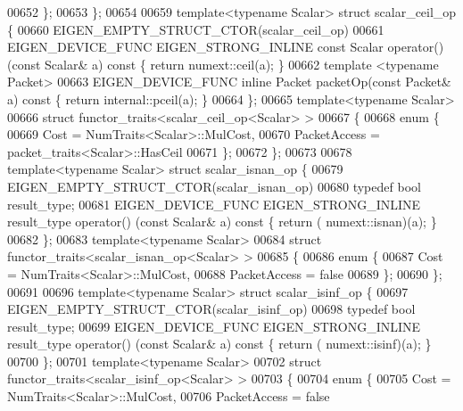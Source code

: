 \begin{DoxyCode}
00652   \};
00653 \};
00654 
00659 \textcolor{keyword}{template}<\textcolor{keyword}{typename} Scalar> \textcolor{keyword}{struct }scalar\_ceil\_op \{
00660   EIGEN\_EMPTY\_STRUCT\_CTOR(scalar\_ceil\_op)
00661   EIGEN\_DEVICE\_FUNC EIGEN\_STRONG\_INLINE \textcolor{keyword}{const} Scalar operator() (\textcolor{keyword}{const} Scalar& a)\textcolor{keyword}{ const }\{ \textcolor{keywordflow}{return} 
      numext::ceil(a); \}
00662   \textcolor{keyword}{template} <\textcolor{keyword}{typename} Packet>
00663   EIGEN\_DEVICE\_FUNC \textcolor{keyword}{inline} Packet packetOp(\textcolor{keyword}{const} Packet& a)\textcolor{keyword}{ const }\{ \textcolor{keywordflow}{return} internal::pceil(a); \}
00664 \};
00665 \textcolor{keyword}{template}<\textcolor{keyword}{typename} Scalar>
00666 \textcolor{keyword}{struct }functor\_traits<scalar\_ceil\_op<Scalar> >
00667 \{
00668   \textcolor{keyword}{enum} \{
00669     Cost = NumTraits<Scalar>::MulCost,
00670     PacketAccess = packet\_traits<Scalar>::HasCeil
00671   \};
00672 \};
00673 
00678 \textcolor{keyword}{template}<\textcolor{keyword}{typename} Scalar> \textcolor{keyword}{struct }scalar\_isnan\_op \{
00679   EIGEN\_EMPTY\_STRUCT\_CTOR(scalar\_isnan\_op)
00680   \textcolor{keyword}{typedef} \textcolor{keywordtype}{bool} result\_type;
00681   EIGEN\_DEVICE\_FUNC EIGEN\_STRONG\_INLINE result\_type operator() (\textcolor{keyword}{const} Scalar& a)\textcolor{keyword}{ const }\{ \textcolor{keywordflow}{return} (
      numext::isnan)(a); \}
00682 \};
00683 \textcolor{keyword}{template}<\textcolor{keyword}{typename} Scalar>
00684 \textcolor{keyword}{struct }functor\_traits<scalar\_isnan\_op<Scalar> >
00685 \{
00686   \textcolor{keyword}{enum} \{
00687     Cost = NumTraits<Scalar>::MulCost,
00688     PacketAccess = \textcolor{keyword}{false}
00689   \};
00690 \};
00691 
00696 \textcolor{keyword}{template}<\textcolor{keyword}{typename} Scalar> \textcolor{keyword}{struct }scalar\_isinf\_op \{
00697   EIGEN\_EMPTY\_STRUCT\_CTOR(scalar\_isinf\_op)
00698   \textcolor{keyword}{typedef} \textcolor{keywordtype}{bool} result\_type;
00699   EIGEN\_DEVICE\_FUNC EIGEN\_STRONG\_INLINE result\_type operator() (\textcolor{keyword}{const} Scalar& a)\textcolor{keyword}{ const }\{ \textcolor{keywordflow}{return} (
      numext::isinf)(a); \}
00700 \};
00701 \textcolor{keyword}{template}<\textcolor{keyword}{typename} Scalar>
00702 \textcolor{keyword}{struct }functor\_traits<scalar\_isinf\_op<Scalar> >
00703 \{
00704   \textcolor{keyword}{enum} \{
00705     Cost = NumTraits<Scalar>::MulCost,
00706     PacketAccess = \textcolor{keyword}{false}

\end{DoxyCode}
